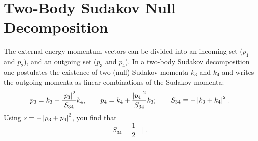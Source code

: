 \section{Two-Body Sudakov Null Decomposition}
The external energy-momentum vectors can be divided into an incoming set ($p_{1}$ and $p_{2}$), and an outgoing set ($p_{3}$ and $p_{4}$). In a two-body Sudakov decomposition one postulates the existence of two (null) Sudakov momenta $k_{3}$ and $k_{4}$ and writes the outgoing momenta as linear combinations of the Sudakov momenta:
\begin{equation}
	p_{3} = k_{3} + \frac{\left\lvert p_{3} \right\rvert^{2}}{S_{34}} k_{4}, \qquad p_{4} = k_{4} + \frac{\left\lvert p_{4} \right\rvert^{2}}{S_{34}} k_{3}; \qquad S_{34} \equiv -\left\lvert k_{3} + k_{4} \right\rvert^{2}.
\end{equation}
Using $s = - \left\lvert p_{3} + p_{4} \right\rvert^{2}$, you find that
\begin{equation}
	S_{34} = \frac{1}{2} \left[ \right].
\end{equation}

